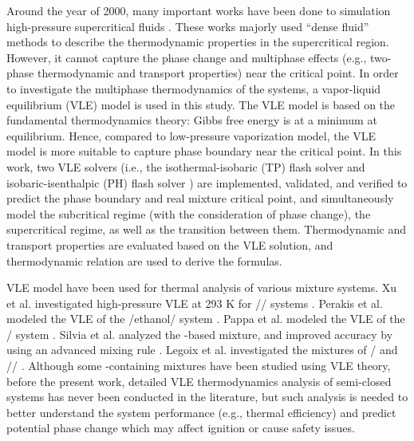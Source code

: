 Around the year of 2000, many important works have been done to simulation high-pressure supercritical fluids \cite{oefelein2005thermophysical,bellan2000supercritical,yang2000modeling}. These works majorly used ``dense fluid'' methods to describe the thermodynamic properties in the supercritical region. However, it cannot capture the phase change and multiphase effects (e.g., two-phase thermodynamic and transport properties) near the critical point.
In order to investigate the multiphase thermodynamics of the  systems, a vapor-liquid equilibrium (VLE) model \cite{michelsen1982isothermal,michelsen1987multiphase} is used in this study. The VLE model is based on the fundamental thermodynamics theory: Gibbs free energy is at a minimum at equilibrium. Hence, compared to low-pressure vaporization model, the VLE model is more suitable to capture phase boundary near the critical point. In this work, two VLE solvers (i.e., the isothermal-isobaric (TP) flash solver \cite{michelsen1982isothermal} and isobaric-isenthalpic (PH) flash solver \cite{michelsen1987multiphase}) are implemented, validated, and verified to predict the phase boundary and real mixture critical point, and simultaneously model the subcritical regime (with the consideration of phase change), the supercritical regime, as well as the transition between them. Thermodynamic and transport properties are evaluated based on the VLE solution, and thermodynamic relation are used to derive the formulas.

VLE model have been used for thermal analysis of various mixture systems. Xu et al. investigated high-pressure VLE at 293 K for // systems \cite{xu1992high}. Perakis et al. modeled the VLE of the /ethanol/ system \cite{perakis2006thermodynamic}. Pappa et al. modeled the VLE of the / system \cite{pappa2009thermodynamic}. Silvia et al. analyzed the -based mixture, and improved accuracy by using an advanced mixing rule \cite{lasala2016vle}. Legoix et al. investigated the mixtures of / and // \cite{legoix2017phase}. Although some -containing mixtures have been studied using VLE theory, before the present work, detailed VLE thermodynamics analysis of semi-closed  systems has never been conducted in the literature, but such analysis is needed to better understand the  system performance (e.g., thermal efficiency) and predict potential phase change which may affect ignition or cause safety issues.

